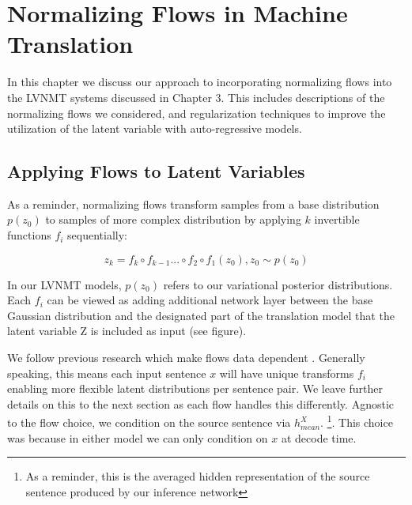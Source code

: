 \chapter{Normalizing Flows in Machine Translation}


In this chapter we discuss our approach to incorporating normalizing flows into the \ac{LVNMT} systems discussed in Chapter 3. This includes descriptions of the normalizing flows we considered, and regularization techniques to improve the utilization of the latent variable with auto-regressive models.
\section{Applying Flows to Latent Variables}


As a reminder, normalizing flows transform samples from a base distribution $p(z_{0})$ to samples of more complex distribution by applying $k$ invertible functions $f_{i}$ sequentially: 

\begin{equation}
z_{k} = f_{k} \circ f_{k-1} ... \circ f_{2} \circ f_{1}(z_{0}) , z_{0} \sim p(z_{0})
\end{equation}

In our \ac{LVNMT} models, $p(z_{0})$ refers to our variational posterior distributions. Each $f_{i}$ can be viewed as adding additional network layer between the base Gaussian distribution and the designated part of the translation model that the latent variable Z is included as input (see figure).

We follow previous research which make flows data dependent \cite{rezende2015VIwithNF,Berg2018SylvesterNF,kingma2016IAF,tomczak2016Householder}.  Generally speaking, this means each input sentence $x$ will have unique transforms $f_{i}$ enabling more flexible latent distributions per sentence pair. We leave further details on this to the next section as each flow handles this differently. Agnostic to the flow choice, we condition on the source sentence via $h_{mean}^{X}$. \footnote{As a reminder, this is the averaged hidden representation of the source sentence produced by our inference network}. This choice was because in either model we can only condition on $x$ at decode time.


